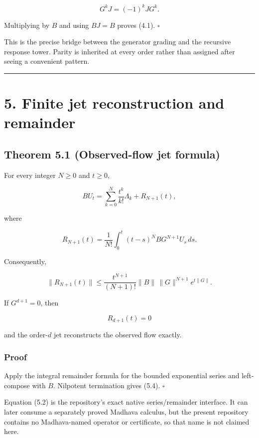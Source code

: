 \[
G^kJ=(-1)^kJG^k.
\]

Multiplying by \(B\) and using \(BJ=B\) proves (4.1). \(\square\)

This is the precise bridge between the generator grading and the recursive
response tower. Parity is inherited at every order rather than assigned after
seeing a convenient pattern.

\begin{center}\rule{0.5\linewidth}{0.5pt}\end{center}

\hypertarget{finite-jet-reconstruction-and-remainder}{%
\section{5. Finite jet reconstruction and remainder}\label{finite-jet-reconstruction-and-remainder}}

\hypertarget{theorem-5.1-observed-flow-jet-formula}{%
\subsection{Theorem 5.1 (Observed-flow jet formula)}\label{theorem-5.1-observed-flow-jet-formula}}

For every integer \(N\ge0\) and \(t\ge0\),

\[
\boxed{
BU_t
=
\sum_{k=0}^{N}\frac{t^k}{k!}\Lambda_k
+R_{N+1}(t),
}
\tag{5.1}
\]

where

\[
\boxed{
R_{N+1}(t)
=
\frac1{N!}
\int_0^t(t-s)^NBG^{N+1}U_s\,ds.
}
\tag{5.2}
\]

Consequently,

\[
\boxed{
\|R_{N+1}(t)\|
\le
\frac{t^{N+1}}{(N+1)!}
\|B\|\,\|G\|^{N+1}e^{t\|G\|}.
}
\tag{5.3}
\]

If \(G^{d+1}=0\), then

\[
\boxed{R_{d+1}(t)=0}
\tag{5.4}
\]

and the order-\(d\) jet reconstructs the observed flow exactly.

\hypertarget{proof-2}{%
\subsubsection{Proof}\label{proof-2}}

Apply the integral remainder formula for the bounded exponential series and
left-compose with \(B\). Nilpotent termination gives (5.4). \(\square\)

Equation (5.2) is the repository's exact native series/remainder interface. It
can later consume a separately proved Madhava calculus, but the present
repository contains no Madhava-named operator or certificate, so that name is
not claimed here.


